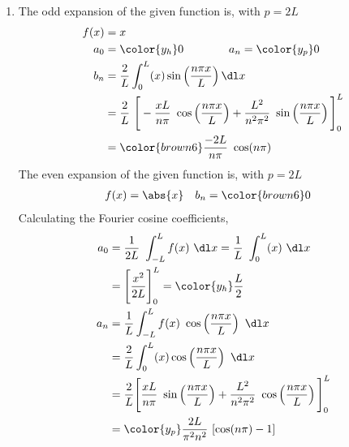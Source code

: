 \begin{enumerate}
    \item The odd expansion of the given function is, with $  p = 2L $
          \begin{align}
              f(x) & = x                                                 \\
              a_0  & = {\color{y_h} 0} \qquad\qquad
              a_n = {\color{y_p} 0}                                      \\
              b_n  & = \frac{2}{L} \int_{0}^{L} (x)\sin\left(
              \frac{n\pi x}{L} \right) \dl x                             \\
                   & =  \frac{2}{L}\ \Bigg[ -\frac{xL}{n\pi}\ \cos\left(
                  \frac{n\pi x}{L} \right)
                  + \frac{L^2}{n^2\pi^2}\ \sin\left( \frac{n\pi x}{L} \right)
              \Bigg]_{0}^{L}                                             \\
                   & = \color{brown6} \frac{-2L}{n\pi}\ \cos(n\pi)
          \end{align}
          The even expansion of the given function is, with $  p = 2L $
          \begin{align}
              f(x) & = \abs{x}          &
              b_n  & = \color{brown6} 0
          \end{align}
          Calculating the Fourier cosine coefficients,
          \begin{align}
              a_0 & = \frac{1}{2L}\ \int_{-L}^{L} f(x)\ \dl x
              = \frac{1}{L}\ \int_{0}^{L} (x)\ \dl x                              \\
                  & =  \Bigg[ \frac{x^2}{2L} \Bigg]_{0}^{L}
              = \color{y_h} \frac{L}{2}                                           \\
              a_n & = \frac{1}{L} \int_{-L}^{L} f(x)\ \cos\left( \frac{n\pi x}{L}
              \right)\ \dl x                                                      \\
                  & = \frac{2}{L} \int_{0}^{L} (x) \cos\left( \frac{n\pi x}{L}
              \right)\ \dl x                                                      \\
                  & = \frac{2}{L}\Bigg[ \frac{xL }{n\pi}\ \sin\left(
                  \frac{n\pi x}{L} \right)
                  + \frac{L^2}{n^2\pi^2}\ \cos\left( \frac{n\pi x}{L}
              \right)\Bigg]_{0}^{L}                                               \\
                  & = \color{y_p} \frac{2L}{\pi^2 n^2}\ [\cos(n\pi) - 1]
          \end{align}


\end{enumerate}
